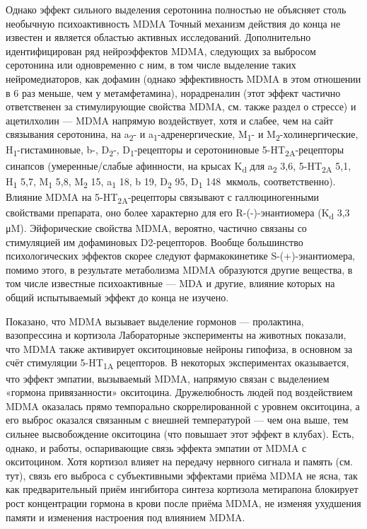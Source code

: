 \documentclass[a4paper,14pt,russian]{report}
\begin{document}
Однако эффект сильного выделения серотонина полностью не объясняет столь необычную психоактивность MDMA Точный механизм действия до конца не известен и является областью активных исследований. Дополнительно идентифицирован ряд нейроэффектов MDMA, следующих за выбросом серотонина или одновременно с ним, в том числе выделение таких нейромедиаторов, как дофамин (однако эффективность MDMA в этом отношении в 6 раз меньше, чем у метамфетамина), норадреналин (этот эффект частично ответственен за стимулирующие свойства MDMA, см. также раздел о стрессе) и ацетилхолин — MDMA напрямую воздействует, хотя и слабее, чем на сайт связывания серотонина, на a\textsubscript{2}- и a\textsubscript{1}-адренергические, M\textsubscript{1}- и M\textsubscript{2}-холинергические, H\textsubscript{1}-гистаминовые, b-, D\textsubscript{2}-, D\textsubscript{1}-рецепторы и серотониновые 5-HT\textsubscript{2A}-рецепторы синапсов (умеренные/слабые афинности, на крысах K\textsubscript{d} для a\textsubscript{2} 3,6, 5-HT\textsubscript{2A} 5,1, H\textsubscript{1} 5,7, M\textsubscript{1} 5,8, M\textsubscript{2} 15, a\textsubscript{1} 18, b 19, D\textsubscript{2} 95, D\textsubscript{1} 148  мкмоль, соответственно). Влияние MDMA на 5-HT\textsubscript{2A}-рецепторы связывают с галлюциногенными свойствами препарата, оно более характерно для его R-(-)-энантиомера (K\textsubscript{d} 3,3 μM). Эйфорические свойства MDMA, вероятно, частично связаны со стимуляцией им дофаминовых D2-рецепторов. Вообще большинство психологических эффектов скорее следуют фармакокинетике S-(+)-энантиомера, помимо этого, в результате метаболизма MDMA образуются другие вещества, в том числе известные психоактивные — MDA и другие, влияние которых на общий испытываемый эффект до конца не изучено.

Показано, что MDMA вызывает выделение гормонов — пролактина, вазопрессина и кортизола Лабораторные эксперименты на животных показали, что MDMA также активирует окситоциновые нейроны гипофиза, в основном за счёт стимуляции 5-HT\textsubscript{1A} рецепторов. В некоторых экспериментах оказывается, что эффект эмпатии, вызываемый MDMA, напрямую связан с выделением «гормона привязанности» окситоцина. Дружелюбность людей под воздействием MDMA оказалась прямо темпорально скоррелированной с уровнем окситоцина, а его выброс оказался связанным с внешней температурой — чем она выше, тем сильнее высвобождение окситоцина (что повышает этот эффект в клубах). Есть, однако, и работы, оспаривающие связь эффекта эмпатии от MDMA с окситоцином. Хотя кортизол влияет на передачу нервного сигнала и память (см. тут), связь его выброса с субъективными эффектами приёма MDMA не ясна, так как предварительный приём ингибитора синтеза кортизола метирапона блокирует рост концентрации гормона в крови после приёма MDMA, не изменяя ухудшения памяти и изменения настроения под влиянием MDMA.
\end{document}
